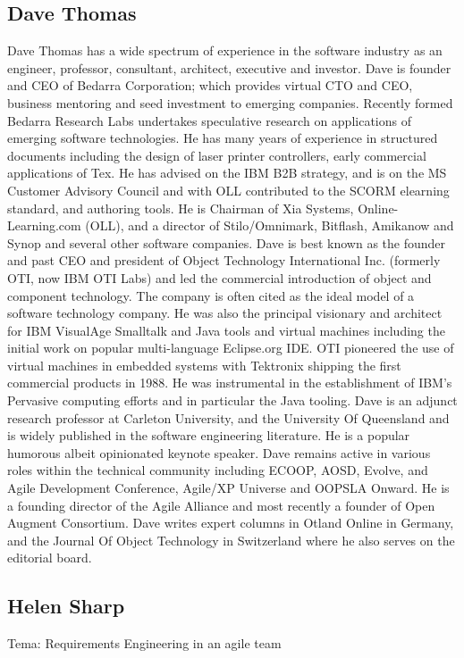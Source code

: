 \subsection{Dave Thomas}
Dave Thomas has a wide spectrum of experience in the software industry as an engineer, professor, consultant, architect, executive and investor. Dave is founder and CEO of Bedarra Corporation; which provides virtual CTO and CEO, business mentoring and seed investment to emerging companies. Recently formed Bedarra Research Labs undertakes speculative research on applications of emerging software technologies.  He has many years of experience in structured documents including the design of laser printer controllers, early commercial applications of Tex. He has advised on the IBM B2B strategy, and is on the MS Customer Advisory Council and with OLL contributed to the SCORM elearning standard, and authoring tools. He is Chairman of Xia Systems, Online-Learning.com (OLL), and a director of Stilo/Omnimark, Bitflash, Amikanow and Synop and several other software companies.  Dave is best known as the founder and past CEO and president of Object Technology International Inc. (formerly OTI, now IBM OTI Labs) and led the commercial introduction of object and component technology. The company is often cited as the ideal model of a software technology company.  He was also the principal visionary and architect for IBM VisualAge Smalltalk and Java tools and virtual machines including the initial work on popular multi-language Eclipse.org IDE. OTI pioneered the use of virtual machines in embedded systems with Tektronix shipping the first commercial products in 1988. He was instrumental in the establishment of IBM’s Pervasive computing efforts and in particular the Java tooling.  Dave is an adjunct research professor at Carleton University, and the University Of Queensland and is widely published in the software engineering literature. He is a popular humorous albeit opinionated keynote speaker. Dave remains active in various roles within the technical community including ECOOP, AOSD, Evolve, and Agile Development Conference, Agile/XP Universe and OOPSLA Onward. He is a founding director of the Agile Alliance and most recently a founder of Open Augment Consortium. Dave writes expert columns in Otland Online in Germany, and the Journal Of Object Technology in Switzerland where he also serves on the editorial board.

\subsection{Helen Sharp}
Tema: Requirements Engineering in an agile team

